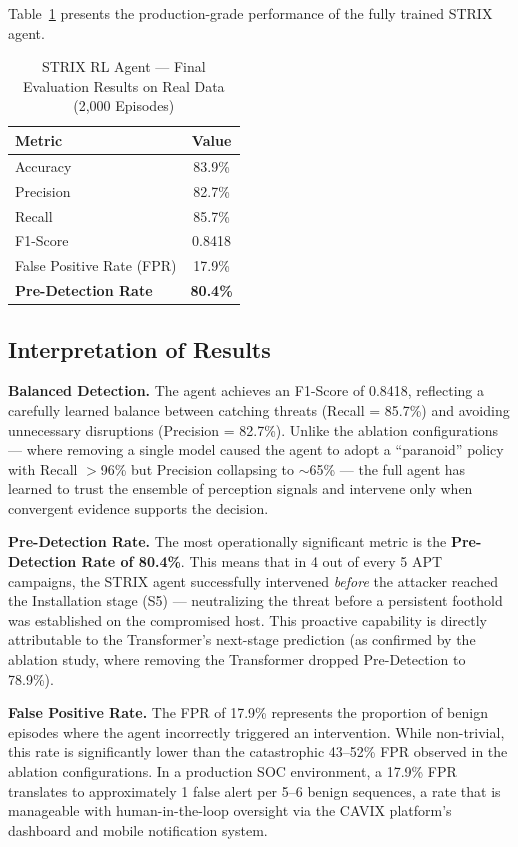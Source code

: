 Table~\ref{tab:rl_final_results} presents the production-grade performance of the fully trained STRIX agent.

\begin{table}[H]
    \centering
    \caption{STRIX RL Agent — Final Evaluation Results on Real Data (2,000 Episodes)}
    \label{tab:rl_final_results}
    \begin{tabular}{lc}
        \toprule
        \textbf{Metric} & \textbf{Value} \\
        \midrule
        Accuracy & 83.9\% \\
        Precision & 82.7\% \\
        Recall & 85.7\% \\
        F1-Score & 0.8418 \\
        False Positive Rate (FPR) & 17.9\% \\
        \textbf{Pre-Detection Rate} & \textbf{80.4\%} \\
        \bottomrule
    \end{tabular}
\end{table}

\subsection{Interpretation of Results}

\textbf{Balanced Detection.} The agent achieves an F1-Score of 0.8418, reflecting a carefully learned balance between catching threats (Recall = 85.7\%) and avoiding unnecessary disruptions (Precision = 82.7\%). Unlike the ablation configurations --- where removing a single model caused the agent to adopt a ``paranoid'' policy with Recall $>$96\% but Precision collapsing to $\sim$65\% --- the full agent has learned to trust the ensemble of perception signals and intervene only when convergent evidence supports the decision.

\textbf{Pre-Detection Rate.} The most operationally significant metric is the \textbf{Pre-Detection Rate of 80.4\%}. This means that in 4 out of every 5 APT campaigns, the STRIX agent successfully intervened \textit{before} the attacker reached the Installation stage (S5) --- neutralizing the threat before a persistent foothold was established on the compromised host. This proactive capability is directly attributable to the Transformer's next-stage prediction (as confirmed by the ablation study, where removing the Transformer dropped Pre-Detection to 78.9\%).

\textbf{False Positive Rate.} The FPR of 17.9\% represents the proportion of benign episodes where the agent incorrectly triggered an intervention. While non-trivial, this rate is significantly lower than the catastrophic 43--52\% FPR observed in the ablation configurations. In a production SOC environment, a 17.9\% FPR translates to approximately 1 false alert per 5--6 benign sequences, a rate that is manageable with human-in-the-loop oversight via the CAVIX platform's dashboard and mobile notification system.


